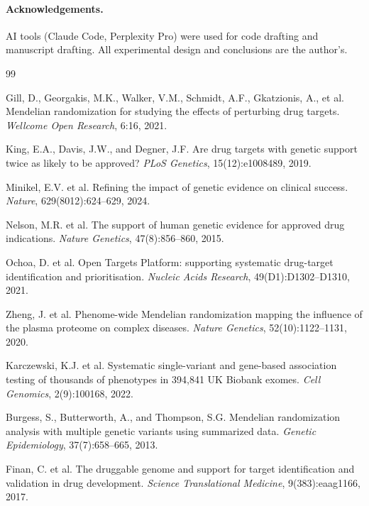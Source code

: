\documentclass[11pt]{article}
\begin{document}
\paragraph{Acknowledgements.}
AI tools (Claude Code, Perplexity Pro) were used for code drafting and manuscript drafting. All experimental design and conclusions are the author's.

\begin{thebibliography}{99}

Gill, D., Georgakis, M.K., Walker, V.M., Schmidt, A.F., Gkatzionis, A., et al.
\newblock Mendelian randomization for studying the effects of perturbing drug targets.
\newblock \emph{Wellcome Open Research}, 6:16, 2021.

King, E.A., Davis, J.W., and Degner, J.F.
\newblock Are drug targets with genetic support twice as likely to be approved?
\newblock \emph{PLoS Genetics}, 15(12):e1008489, 2019.

Minikel, E.V. et al.
\newblock Refining the impact of genetic evidence on clinical success.
\newblock \emph{Nature}, 629(8012):624--629, 2024.

Nelson, M.R. et al.
\newblock The support of human genetic evidence for approved drug indications.
\newblock \emph{Nature Genetics}, 47(8):856--860, 2015.

Ochoa, D. et al.
\newblock Open Targets Platform: supporting systematic drug-target identification and prioritisation.
\newblock \emph{Nucleic Acids Research}, 49(D1):D1302--D1310, 2021.

Zheng, J. et al.
\newblock Phenome-wide Mendelian randomization mapping the influence of the plasma proteome on complex diseases.
\newblock \emph{Nature Genetics}, 52(10):1122--1131, 2020.

Karczewski, K.J. et al.
\newblock Systematic single-variant and gene-based association testing of thousands of phenotypes in 394,841 UK Biobank exomes.
\newblock \emph{Cell Genomics}, 2(9):100168, 2022.

Burgess, S., Butterworth, A., and Thompson, S.G.
\newblock Mendelian randomization analysis with multiple genetic variants using summarized data.
\newblock \emph{Genetic Epidemiology}, 37(7):658--665, 2013.

Finan, C. et al.
\newblock The druggable genome and support for target identification and validation in drug development.
\newblock \emph{Science Translational Medicine}, 9(383):eaag1166, 2017.


\end{thebibliography}
\end{document}
